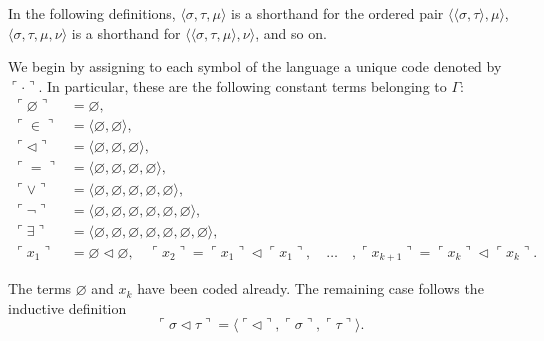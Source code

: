 In the following definitions, $\langle \sigma, \tau, \mu \rangle$ is a shorthand for the ordered
pair $\langle \langle \sigma, \tau \rangle, \mu \rangle$,
$\langle \sigma, \tau, \mu, \nu \rangle$ is a shorthand for 
$\langle \langle \sigma, \tau, \mu \rangle, \nu \rangle$, and so on.

\begin{definition}
    \label{def:Code.Symbol}
    \leanok
    We begin by assigning to each symbol of the language a unique code denoted by
    $\ulcorner \cdot\urcorner$.
    In particular, these are the following constant terms belonging to $\Gamma$:
    $$
    \begin{aligned}
    \ulcorner{\varnothing}\urcorner & =\varnothing, \\
    \ulcorner{\in}\urcorner & =\langle \varnothing,\varnothing\rangle, \\
    \ulcorner{\lhd}\urcorner & =\langle \varnothing,\varnothing,\varnothing\rangle, \\
    \ulcorner{=}\urcorner & =\langle \varnothing,\varnothing,\varnothing,\varnothing\rangle, \\
    \ulcorner{\lor}\urcorner & =
    \langle \varnothing,\varnothing,\varnothing,\varnothing,\varnothing\rangle, \\
    \ulcorner{\neg}\urcorner & =
    \langle \varnothing,\varnothing,\varnothing,\varnothing,\varnothing,\varnothing\rangle, \\
    \ulcorner{\exists}\urcorner & =
    \langle \varnothing,\varnothing,\varnothing,\varnothing,\varnothing,\varnothing,
    \varnothing\rangle,\\
    \ulcorner{x_1}\urcorner & = \varnothing \lhd \varnothing, \quad 
    \ulcorner{x_2}\urcorner = \ulcorner{x_1}\urcorner \lhd \ulcorner{x_1}\urcorner,\quad\ldots\quad,
    \ulcorner{x_{k+1}}\urcorner = \ulcorner{x_k}\urcorner \lhd \ulcorner{x_k}\urcorner.
    \end{aligned}
    $$
\end{definition}

\begin{definition}
    \label{def:Code.Term}
    \leanok
    The terms $\varnothing$ and $x_k$ have been coded already. 
    The remaining case follows the inductive definition
    $$
    \ulcorner{\sigma \lhd \tau}\urcorner = 
    \langle\ulcorner{\lhd}\urcorner, \ulcorner{\sigma}\urcorner, \ulcorner{\tau}\urcorner \rangle.
    $$
\end{definition}

